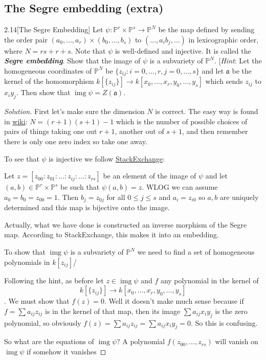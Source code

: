\subsection{The Segre embedding (extra)}

\begin{manualexercise}{2.14}[The Segre Embedding]
	Let $\psi:\mathbb{P}^r\times\mathbb{P}^s\to\mathbb{P}^N$ be the map defined by sending the order pair $(a_0,\ldots,a_r)\times(b_0,\ldots,b_s)$ to $(\ldots,a_ib_j,\ldots)$ in lexicographic order, where $N=rs+r+s$. Note that $\psi$ is well-defined and injective. It is called the \textbf{\textit{Segre embedding}}. Show that the image of $\psi$ is a subvariety of $\mathbb{P}^N$. [\textit{Hint}: Let the homogeneous coordinates of $\mathbb{P}^N$ be $\{z_{ij}:i=0,\ldots,r,j=0,\ldots,s\}$ and let $\mathfrak{a}$ be the kernel of the homomorphism $k[\{z_{ij}\}]\to k[x_0,\ldots,x_r,y_0,\ldots,y_s]$ which sends $z_{ij}$ to $x_iy_j$. Then show that $\operatorname{img}\psi=Z(\mathfrak{a})$.
\end{manualexercise}

\begin{proof}[Solution]
	First let's make sure the dimension $N$ is correct. The easy way is found in \href{https://en.wikipedia.org/wiki/Segre_embedding}{wiki}: $N=(r+1)(s+1)-1$ which is the number of possible choices of pairs of things taking one out $r+1$, another out of $s+1$, and then remember there is only one zero index so take one away.
	
	To see that $\psi$ is injective we follow \href{https://math.stackexchange.com/questions/3683364/segre-map-is-an-embedding}{StackExchange}: 
	{\color{azure}Let $z=[z_{00}:z_{01}:\ldots:z_{ij}:\ldots:z_{rs}]$ be an element of the image of $\psi$ and let $(a,b)\in\mathbb{P}^r\times\mathbb{P}^s$ be such that $\psi(a,b)=z$. WLOG we can assume $a_0=b_0=z_{00}=1$. Then $b_j=z_{0j}$ for all $0\leq j\leq s$ and $a_i=z_{i0}$ so $a,b$ are uniquely determined and this map is bijective onto the image.
	
	Actually, what we have done is constructed an inverse morphism of the Segre map. According to StackExchange, this makes it into an embedding.}
	
	To show that $\operatorname{img}\psi$ is a subvariety of $\mathbb{P}^N$ we need to find a set of homogeneous polynomials in $k[z_{ij}]$/
	
	Following the hint, as before let $z\in\operatorname{img}\psi$ and $f$ any polynomial in the kernel of \[k[\{z_{ij}\}]\to k[x_0,\ldots,x_r,y_0,\ldots,y_s]\]. We must show that $f(z)=0$. Well it doesn't make much sense because if $f=\sum a_{ij}z_{ij}$ is in the kernel of that map, then its image $\sum a_{ij}x_iy_j$ is the zero polynomial, so obviously $f(z)=\sum a_{ij}z_{ij}=\sum a_{ij}x_iy_j=0$. So this is confusing.
	
	So what are the equations of $\operatorname{img}\psi$? A polynomial $f(z_{00},\ldots,z_{rs})$ will vanish on $\operatorname{img}\psi$ if somehow it vanishes 
\end{proof}

